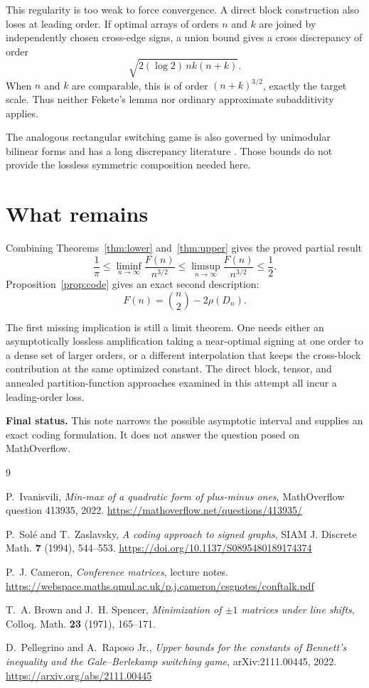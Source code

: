 \documentclass[11pt]{article}
\begin{document}
This regularity is too weak to force convergence. A direct block
construction also loses at leading order. If optimal arrays of orders
\(n\) and \(k\) are joined by independently chosen cross-edge signs,
a union bound gives a cross discrepancy of order
\[
 \sqrt{2(\log2)\,nk(n+k)}.
\]
When \(n\) and \(k\) are comparable, this is of order
\((n+k)^{3/2}\), exactly the target scale. Thus neither Fekete's lemma
nor ordinary approximate subadditivity applies.

The analogous rectangular switching game is also governed by
unimodular bilinear forms and has a long discrepancy literature
\cite{brown-spencer,pellegrino-raposo}. Those bounds do not provide the
lossless symmetric composition needed here.

\section{What remains}

Combining Theorems~\ref{thm:lower} and~\ref{thm:upper} gives the proved
partial result
\[
\boxed{
\frac1\pi
\le \liminf_{n\to\infty}\frac{F(n)}{n^{3/2}}
\le \limsup_{n\to\infty}\frac{F(n)}{n^{3/2}}
\le\frac12.
}
\]
Proposition~\ref{prop:code} gives an exact second description:
\[
\boxed{F(n)=\binom n2-2\rho(D_n).}
\]

The first missing implication is still a limit theorem. One needs either
an asymptotically lossless amplification taking a near-optimal signing
at one order to a dense set of larger orders, or a different
interpolation that keeps the cross-block contribution at the same
optimized constant. The direct block, tensor, and annealed
partition-function approaches examined in this attempt all incur a
leading-order loss.

\medskip
\noindent\textbf{Final status.}
This note narrows the possible asymptotic interval and supplies an exact
coding formulation. It does not answer the question posed on
MathOverflow.

\begin{thebibliography}{9}

P.~Ivanisvili,
\emph{Min-max of a quadratic form of plus-minus ones},
MathOverflow question 413935, 2022.
\url{https://mathoverflow.net/questions/413935/}

P.~Sol\'e and T.~Zaslavsky,
\emph{A coding approach to signed graphs},
SIAM J. Discrete Math. \textbf{7} (1994), 544--553.
\url{https://doi.org/10.1137/S0895480189174374}

P.~J. Cameron,
\emph{Conference matrices}, lecture notes.
\url{https://webspace.maths.qmul.ac.uk/p.j.cameron/csgnotes/conftalk.pdf}

T.~A. Brown and J.~H. Spencer,
\emph{Minimization of \(\pm1\) matrices under line shifts},
Colloq. Math. \textbf{23} (1971), 165--171.

D.~Pellegrino and A.~Raposo Jr.,
\emph{Upper bounds for the constants of Bennett's inequality and the
Gale--Berlekamp switching game},
arXiv:2111.00445, 2022.
\url{https://arxiv.org/abs/2111.00445}

\end{thebibliography}
\end{document}
